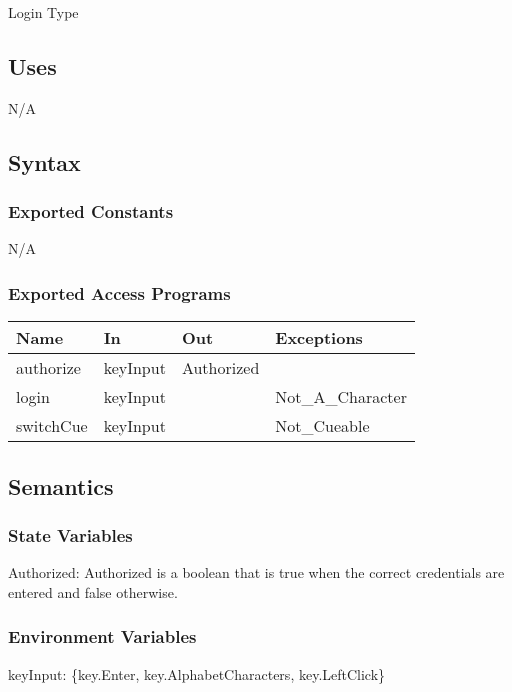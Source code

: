 \documentclass[12pt, titlepage]{article}
\begin{document}
Login Type

\subsection{Uses}
N/A

\subsection{Syntax}

\subsubsection{Exported Constants}
N/A

\subsubsection{Exported Access Programs}

\begin{center}
\begin{tabular}{p{4cm} p{4cm} p{4cm} p{4cm}}
\hline
\textbf{Name} & \textbf{In} & \textbf{Out} & \textbf{Exceptions} \\
\hline
authorize & keyInput & Authorized & \\
\hline
login & keyInput &  & Not\_A\_Character \\
\hline
switchCue & keyInput &  & Not\_Cueable \\
\hline
\end{tabular}
\end{center}

\subsection{Semantics}

\subsubsection{State Variables}

Authorized: Authorized is a boolean that is true when the correct credentials are entered and false otherwise.

\subsubsection{Environment Variables}

keyInput: \{key.Enter, key.AlphabetCharacters, key.LeftClick\}
\end{document}
